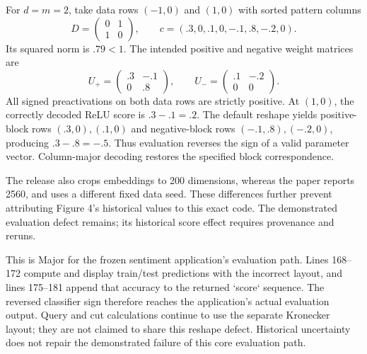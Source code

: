 \documentclass[10pt]{article}
\begin{document}
For \(d=m=2\), take data rows \((-1,0)\) and \((1,0)\) with sorted pattern columns \[D=\begin{pmatrix}0&1\\1&0\end{pmatrix},\qquad
 c=(.3,0,.1,0,-.1,.8,-.2,0).\] Its squared norm is \(.79<1\). The intended positive and negative weight matrices are \[U_+=\begin{pmatrix}.3&-.1\\0&.8\end{pmatrix},
 \qquad
 U_-=\begin{pmatrix}.1&-.2\\0&0\end{pmatrix}.\] All signed preactivations on both data rows are strictly positive. At \((1,0)\), the correctly decoded ReLU score is \(.3-.1=.2\). The default reshape yields positive-block rows \((.3,0),(.1,0)\) and negative-block rows \((-.1,.8),(-.2,0)\), producing \(.3-.8=-.5\). Thus evaluation reverses the sign of a valid parameter vector. Column-major decoding restores the specified block correspondence.\par
The release also crops embeddings to 200 dimensions, whereas the paper reports 2560, and uses a different fixed data seed. These differences further prevent attributing Figure 4’s historical values to this exact code. The demonstrated evaluation defect remains; its historical score effect requires provenance and reruns.\par
This is Major for the frozen sentiment application’s evaluation path. Lines 168–172 compute and display train/test predictions with the incorrect layout, and lines 175–181 append that accuracy to the returned `score` sequence. The reversed classifier sign therefore reaches the application’s actual evaluation output. Query and cut calculations continue to use the separate Kronecker layout; they are not claimed to share this reshape defect. Historical uncertainty does not repair the demonstrated failure of this core evaluation path.\par
\end{document}
